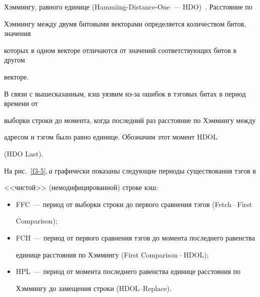 Хэммингу, равного единице  (Hammiing-Distance-One~--- HDO)~\cite{1-5}.  Расстояние по 


Хэммингу меж\-ду дву\-мя битовыми векторами определяется количеством битов, значения 


которых  в одном векторе отличаются  от значений соответствующих битов в другом 


векторе.  


%


В связи с вышесказанным, кэш уязвим из-за ошибок в тэговых битах  в период времени от  


выборки строки до момента, когда последний раз расстояние  по Хэммингу между 


адресом и тэгом было равно единице. Обозначим этот момент  HDOL  


(HDO Last).


          


          На рис.~\ref{f3-5},\,\textit{а} графически показаны  следующие периоды существования тэгов в 


<<чистой>> (немодифицированной) строке кэш:


          \begin{itemize}


\item FFC~--- период от выборки строки до первого сравнения тэгов (Fetch\,--\,First 


Comparison);


\item FCH~--- период от первого сравнения тэгов до момента последнего равенства 


единице расстояния по Хэммингу (First Comparison\,--\,HDOL);


\item HPL~--- период от момента последнего равенства единице расстояния по 


Хэммингу до замещения строки (HDOL--\linebreak Replace). 


\end{itemize}


 


